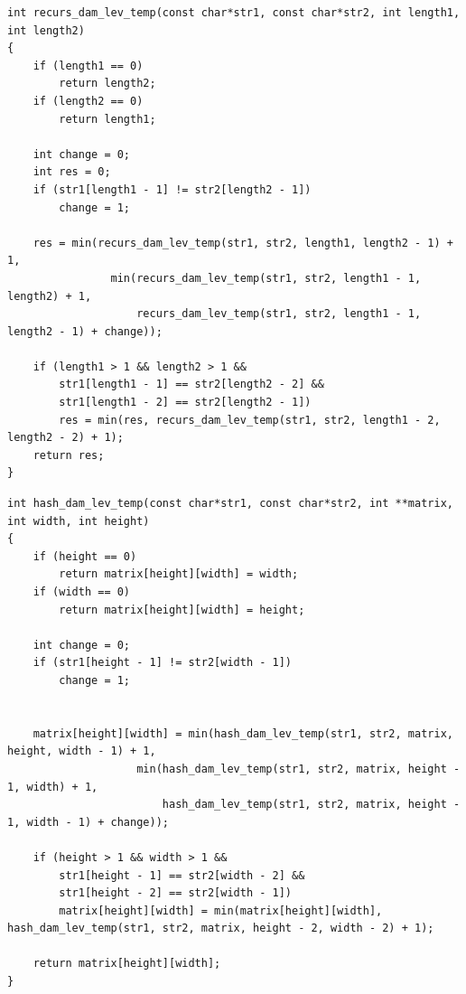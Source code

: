 \begin{lstlisting}[caption=Рекурсивный алгоритм поиска расстояния Дамерау~---~Левенштейна]
int recurs_dam_lev_temp(const char*str1, const char*str2, int length1, int length2)
{
    if (length1 == 0)
        return length2;
    if (length2 == 0)
        return length1;

    int change = 0;
    int res = 0;
    if (str1[length1 - 1] != str2[length2 - 1])
        change = 1;

    res = min(recurs_dam_lev_temp(str1, str2, length1, length2 - 1) + 1,
                min(recurs_dam_lev_temp(str1, str2, length1 - 1, length2) + 1,
                    recurs_dam_lev_temp(str1, str2, length1 - 1, length2 - 1) + change));

    if (length1 > 1 && length2 > 1 &&
        str1[length1 - 1] == str2[length2 - 2] &&
        str1[length1 - 2] == str2[length2 - 1])
        res = min(res, recurs_dam_lev_temp(str1, str2, length1 - 2, length2 - 2) + 1);
    return res;    
}
\end{lstlisting}
\clearpage
\begin{lstlisting}[caption=Рекурсивный алгоритм поиска расстояния Дамерау~---~Левенштейна с кэшированием (реализация)]
int hash_dam_lev_temp(const char*str1, const char*str2, int **matrix, int width, int height)
{
    if (height == 0)
        return matrix[height][width] = width;
    if (width == 0)
        return matrix[height][width] = height;

    int change = 0;
    if (str1[height - 1] != str2[width - 1])
        change = 1;


    matrix[height][width] = min(hash_dam_lev_temp(str1, str2, matrix, height, width - 1) + 1,
                    min(hash_dam_lev_temp(str1, str2, matrix, height - 1, width) + 1,
                        hash_dam_lev_temp(str1, str2, matrix, height - 1, width - 1) + change));

    if (height > 1 && width > 1 &&
        str1[height - 1] == str2[width - 2] &&
        str1[height - 2] == str2[width - 1])
        matrix[height][width] = min(matrix[height][width], hash_dam_lev_temp(str1, str2, matrix, height - 2, width - 2) + 1);

    return matrix[height][width];
}
\end{lstlisting}
\clearpage
